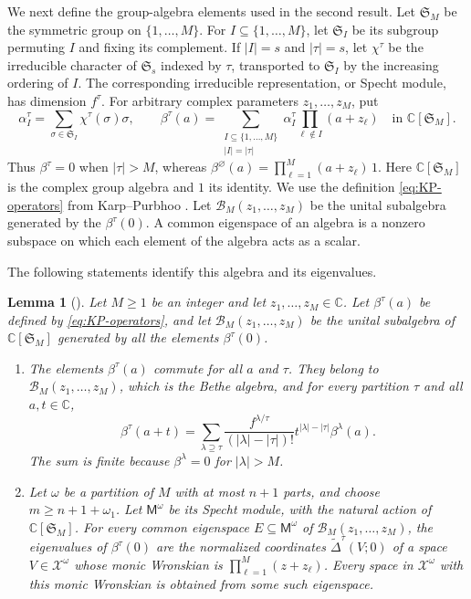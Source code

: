 \documentclass[11pt,letterpaper,reqno]{amsart}
\newtheorem{lem}[thm]{Lemma}
\theoremstyle{remark}
\numberwithin{equation}{section}
\newcommand{\C}{\mathbb C}
\begin{document}
We next define the group-algebra elements used in the second result.
Let $\mathfrak S_M$ be the symmetric group on $\{1,\ldots,M\}$.
For $I\subseteq\{1,\ldots,M\}$, let $\mathfrak S_I$ be its subgroup
permuting $I$ and fixing its complement. If $|I|=s$ and $|\tau|=s$, let
$\chi^\tau$ be the irreducible character of $\mathfrak S_s$ indexed by
$\tau$, transported to $\mathfrak S_I$ by the increasing ordering of $I$.
The corresponding irreducible representation, or Specht module, has
dimension $f^\tau$. For arbitrary complex parameters $z_1,\ldots,z_M$, put
\begin{equation}\label{eq:KP-operators}
 \alpha_I^\tau=\sum_{\sigma\in\mathfrak S_I}\chi^\tau(\sigma)\sigma,
 \qquad
 \beta^\tau(a)=
 \sum_{\substack{I\subseteq\{1,\ldots,M\}\\ |I|=|\tau|}}
 \alpha_I^\tau\prod_{\ell\notin I}(a+z_\ell)
 \quad\text{in }\C[\mathfrak S_M].
\end{equation}
Thus $\beta^\tau=0$ when $|\tau|>M$, whereas
$\beta^\varnothing(a)=\prod_{\ell=1}^M(a+z_\ell)\,1$.
Here $\C[\mathfrak S_M]$ is the complex group algebra and $1$ its identity.
We use the definition \eqref{eq:KP-operators} from
Karp--Purbhoo \cite[equation~(1.2)]{KP26}. Let
$\mathcal B_M(z_1,\ldots,z_M)$ be the unital subalgebra generated by the
$\beta^\tau(0)$. A common eigenspace of an algebra is a nonzero subspace
on which each element of the algebra acts as a scalar.

The following statements identify this algebra and its eigenvalues.

\begin{lem}[{\cite[Theorem~1.3(i),(ii),(iv),(v) and Corollary~4.15]{KP26}}]
\label{lem:KP-correspondence}
Let $M\geq1$ be an integer and let $z_1,\ldots,z_M\in\C$. Let
$\beta^\tau(a)$ be defined by \eqref{eq:KP-operators}, and let
$\mathcal B_M(z_1,\ldots,z_M)$ be the unital subalgebra of
$\C[\mathfrak S_M]$ generated by all the elements $\beta^\tau(0)$.
\begin{enumerate}
\item The elements $\beta^\tau(a)$ commute for all $a$ and $\tau$.
They belong to $\mathcal B_M(z_1,\ldots,z_M)$, which is the Bethe algebra,
and for every partition $\tau$ and all $a,t\in\C$,
\begin{equation}\label{eq:KP-translation}
 \beta^\tau(a+t)=\sum_{\lambda\supseteq\tau}
 \frac{f^{\lambda/\tau}}{(|\lambda|-|\tau|)!}
 t^{|\lambda|-|\tau|}\beta^\lambda(a).
\end{equation}
The sum is finite because $\beta^\lambda=0$ for $|\lambda|>M$.
\item Let $\omega$ be a partition of $M$ with at most $n+1$ parts, and
choose $m\geq n+1+\omega_1$. Let $\mathsf M^\omega$ be its Specht module,
with the natural action of $\C[\mathfrak S_M]$. For every common eigenspace
$E\subseteq\mathsf M^\omega$ of $\mathcal B_M(z_1,\ldots,z_M)$, the
eigenvalues of $\beta^\tau(0)$ are the normalized coordinates
$\widetilde\Delta^\tau(V;0)$ of a space $V\in\mathcal X^\omega$ whose
monic Wronskian is $\prod_{\ell=1}^M(z+z_\ell)$.
Every space in $\mathcal X^\omega$ with this monic Wronskian is obtained
from some such eigenspace.
\end{enumerate}
\end{lem}
\end{document}
